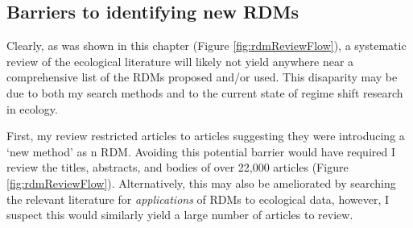 \documentclass[12pt,twoside,openany]{reedthesis}
\begin{document}
\subsection{Barriers to identifying new
RDMs}\label{barriers-to-identifying-new-rdms}

Clearly, as was shown in this chapter (Figure \ref{fig:rdmReviewFlow}),
a systematic review of the ecological literature will likely not yield
anywhere near a comprehensive list of the RDMs proposed and/or used.
This disaparity may be due to both my search methods and to the current
state of regime shift research in ecology.

First, my review restricted articles to articles suggesting they were
introducing a `new method' as n RDM. Avoiding this potential barrier
would have required I review the titles, abstracts, and bodies of over
22,000 articles (Figure \ref{fig:rdmReviewFlow}). Alternatively, this
may also be ameliorated by searching the relevant literature for
\emph{applications} of RDMs to ecological data, however, I suspect this
would similarly yield a large number of articles to review.
\end{document}
